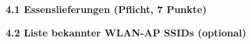 \documentclass[ngerman]{fbi-aufgabenblatt}
\begin{document}
%
%
\newpage
{}

\textbf{4.1 Essenslieferungen (Pflicht, 7 Punkte)}

\textbf{4.2 Liste bekannter WLAN-AP SSIDs (optional)}


\newpage
{}
 







%
\end{document}
